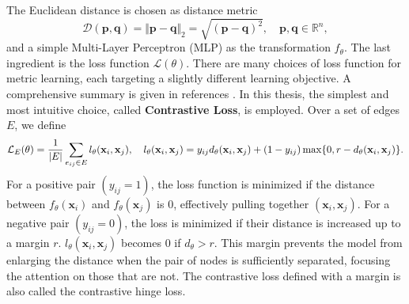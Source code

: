 The Euclidean distance is chosen as distance metric
\begin{equation}
    \mathcal{D}(\mathbf{p},\mathbf{q}) = \Vert \mathbf{p} - \mathbf{q} \Vert_2 = \sqrt{ (\mathbf{p} - \mathbf{q})^2 }, \quad \mathbf{p}, \mathbf{q}\in \mathbb{R}^n,
\end{equation}
and a simple Multi-Layer Perceptron (MLP) as the transformation $f_{\theta}$. The last ingredient is the loss function $\mathcal{L}(\theta)$. There are many choices of loss function for metric learning, each targeting a slightly different learning objective. A comprehensive summary is given in references \cite{metric-learning-rev2, metric-learning-rev4}. In this thesis, the simplest and most intuitive choice, called \textbf{Contrastive Loss}, is employed. Over a set of edges $E$, we define
\begin{equation}
    \label{eq:9.6}
    \mathcal{L}_{E}(\theta) = \frac{1}{\abs{E}} \sum_{e_{ij}\in E} l_{\theta}(\mathbf{x}_i, \mathbf{x}_j), \quad l_{\theta}(\mathbf{x}_i, \mathbf{x}_j) = y_{ij}d_{\theta}(\mathbf{x}_i, \mathbf{x}_j) + (1-y_{ij})\max\{0, r-{d_{\theta}}(\mathbf{x}_i, \mathbf{x}_j) \}.
\end{equation}
For a positive pair $(y_{ij}=1)$, the loss function is minimized if the distance between $f_{\theta}(\mathbf{x}_i)$ and $f_{\theta}(\mathbf{x}_j)$ is 0, effectively pulling together $(\mathbf{x}_i, \mathbf{x}_j)$.
For a negative pair $(y_{ij}=0)$, the loss is minimized if their distance is increased up to a margin $r$. 
$l_{\theta}(\mathbf{x}_i, \mathbf{x}_j)$ becomes 0 if $d_{\theta} > r$. 
This margin prevents the model from enlarging the distance when the pair of nodes is sufficiently separated, focusing the attention on those that are not. 
The contrastive loss defined with a margin is also called the contrastive hinge loss. 

